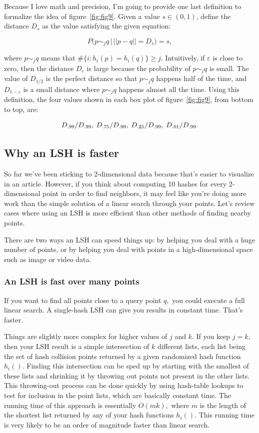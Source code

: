 \documentclass[20pt,]{extarticle}
\begin{document}
Because I love math and precision, I'm going to provide one last
definition to formalize the idea of figure~\ref{fig:fig9}. Given a value
\(s \in (0, 1)\), define the distance \(D_s\) as the value satisfying
the given equation:

\[ P\big(p \sim_j q \, \big| \, ||p-q|| = D_s\big) = s, \]

where \(p\sim_j q\) means that \(\#\{i : h_i(p) = h_i(q)\} \ge j.\)
Intuitively, if \(\varepsilon\) is close to zero, then the distance
\(D_\varepsilon\) is large because the probability of \(p\sim_j q\) is
small. The value of \(D_{1/2}\) is the perfect distance so that
\(p \sim_j q\) happens half of the time, and \(D_{1-\varepsilon}\) is a
small distance where \(p \sim_j q\) happens almost all the time. Using
this definition, the four values shown in each box plot of
figure~\ref{fig:fig9}, from bottom to top, are:

\[D_{.99} / D_{.99} ,\;\;{\hskip -0.3em}
D_{.75} / D_{.99}   ,\;\;{\hskip -0.3em}
D_{.25} / D_{.99}   ,\;\;{\hskip -0.3em}
D_{.01} / D_{.99}.\]

\subsection{Why an LSH is faster}\label{why-an-lsh-is-faster}

So far we've been sticking to 2-dimensional data because that's easier
to visualize in an article. However, if you think about computing 10
hashes for every 2-dimensional point in order to find neighbors, it may
feel like you're doing more work than the simple solution of a linear
search through your points. Let's review cases where using an LSH is
more efficient than other methods of finding nearby points.

There are two ways an LSH can speed things up: by helping you deal with
a huge number of points, or by helping you deal with points in a
high-dimensional space such as image or video data.

\subsubsection{An LSH is fast over many
points}\label{an-lsh-is-fast-over-many-points}

If you want to find all points close to a query point \(q,\) you could
execute a full linear search. A single-hash LSH can give you results in
constant time. That's faster.

Things are slightly more complex for higher values of \(j\) and \(k.\)
If you keep \(j=k,\) then your LSH result is a simple intersection of
\(k\) different lists, each list being the set of hash collision points
returned by a given randomized hash function \(h_i().\) Finding this
intersection can be sped up by starting with the smallest of these lists
and shrinking it by throwing out points not present in the other lists.
This throwing-out process can be done quickly by using hash-table
lookups to test for inclusion in the point lists, which are basically
constant time. The running time of this approach is essentially
\(O(mk),\) where \(m\) is the length of the shortest list returned by
any of your hash functions \(h_i().\) This running time is very likely
to be an order of magnitude faster than linear search.
\end{document}
